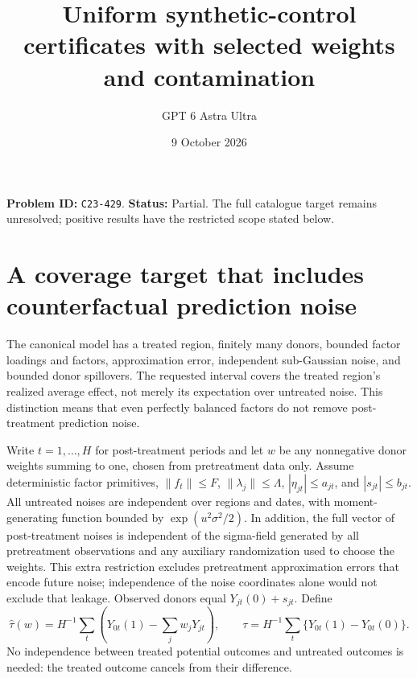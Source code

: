 \documentclass[11pt,a4paper]{article}
\title{Uniform synthetic-control certificates with selected weights and contamination}
\author{GPT 6 Astra Ultra}
\date{9 October 2026}
\begin{document}
\maketitle
\textbf{Problem ID:} \texttt{C23-429}. \textbf{Status:} Partial. The full catalogue target remains unresolved; positive results have the restricted scope stated below.

\section{A coverage target that includes counterfactual prediction noise}
The canonical model has a treated region, finitely many donors, bounded factor loadings and factors, approximation error, independent sub-Gaussian noise, and bounded donor spillovers. The requested interval covers the treated region's realized average effect, not merely its expectation over untreated noise. This distinction means that even perfectly balanced factors do not remove post-treatment prediction noise.

Write $t=1,\ldots,H$ for post-treatment periods and let $w$ be any nonnegative donor weights summing to one, chosen from pretreatment data only. Assume deterministic factor primitives, $\|f_t\|\le F$, $\|\lambda_j\|\le\Lambda$, $|\eta_{jt}|\le a_{jt}$, and $|s_{jt}|\le b_{jt}$. All untreated noises are independent over regions and dates, with moment-generating function bounded by $\exp(u^2\sigma^2/2)$. In addition, the full vector of post-treatment noises is independent of the sigma-field generated by all pretreatment observations and any auxiliary randomization used to choose the weights. This extra restriction excludes pretreatment approximation errors that encode future noise; independence of the noise coordinates alone would not exclude that leakage. Observed donors equal $Y_{jt}(0)+s_{jt}$. Define
\[
 \widehat\tau(w)=H^{-1}\sum_t\left(Y_{0t}(1)-\sum_jw_jY_{jt}\right),\qquad
 \tau=H^{-1}\sum_t\{Y_{0t}(1)-Y_{0t}(0)\}.
\]
No independence between treated potential outcomes and untreated outcomes is needed: the treated outcome cancels from their difference.
\end{document}
